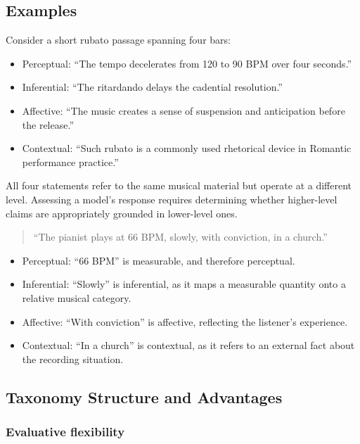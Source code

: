 \documentclass[conference,a4paper]{APSIPA2026}
\begin{document}
\subsection{Examples}

Consider a short rubato passage spanning four bars:

\begin{itemize}
    \item Perceptual: ``The tempo decelerates from 120 to 90 BPM over four seconds.''
    \item Inferential: ``The ritardando delays the cadential resolution.''
    \item Affective: ``The music creates a sense of suspension and anticipation before the release.''
    \item Contextual: ``Such rubato is a commonly used rhetorical device in Romantic performance practice.''
\end{itemize}

All four statements refer to the same musical material but operate at a different level. Assessing a model’s response requires determining whether higher-level claims are appropriately grounded in lower-level ones.

\begin{quote}
``The pianist plays at 66 BPM, slowly, with conviction, in a church.''
\end{quote}

\begin{itemize}
    \item Perceptual: ``66 BPM'' is measurable, and therefore perceptual.
    \item Inferential: ``Slowly'' is inferential, as it maps a measurable quantity onto a relative musical category.
    \item Affective: ``With conviction'' is affective, reflecting the listener’s experience.
    \item Contextual: ``In a church'' is contextual, as it refers to an external fact about the recording situation.
\end{itemize}


\subsection{Taxonomy Structure and Advantages}

\subsubsection{Evaluative flexibility}
\end{document}
